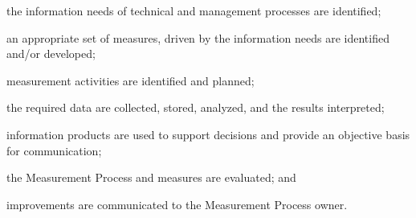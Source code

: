 			\begin{adjustwidth}{2em}{0pt} 

				\begin{compactitem}

					\item the information needs of technical and management processes are identified;

					\item an appropriate set of measures, driven by the information needs are identified and/or developed;

					\item measurement activities are identified and planned;

					\item the required data are collected, stored, analyzed, and the results interpreted;

					\item information products are used to support decisions and provide an objective basis for communication;

					\item the Measurement Process and measures are evaluated; and

					\item improvements are communicated to the Measurement Process owner.

				\end{compactitem}

			\end{adjustwidth}

